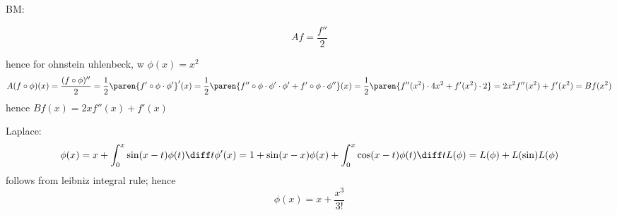 BM:

\[
Af = \frac{f''}{2}
\]

hence for ohnstein uhlenbeck, w $\phi(x) = x^2$
\[
A(f \circ \phi)(x)
= \frac{(f \circ \phi)''}{2}
= \frac{1}{2}\paren{f' \circ \phi \cdot \phi'}'(x)
= \frac{1}{2}\paren{f'' \circ \phi \cdot \phi' \cdot \phi' + f'\circ\phi\cdot\phi''}(x)
= \frac{1}{2}\paren{f''(x^2) \cdot 4x^2 + f'(x^2) \cdot 2}
= 2x^2 f''(x^2) + f'(x^2)
= Bf(x^2)
\]
hence $Bf(x) = 2x f''(x) + f'(x)$


Laplace:
\[
\phi(x) = x + \int_0^x \sin(x-t) \phi(t) \diff t
\phi'(x) = 1 + \sin(x - x) \phi(x) + \int_0^x \cos(x-t) \phi(t) \diff t
L(\phi) = L(\phi) + L(\sin) L(\phi)
\]
follows from leibniz integral rule; hence
\[
\phi(x) = x + \frac{x^3}{3!}
\]